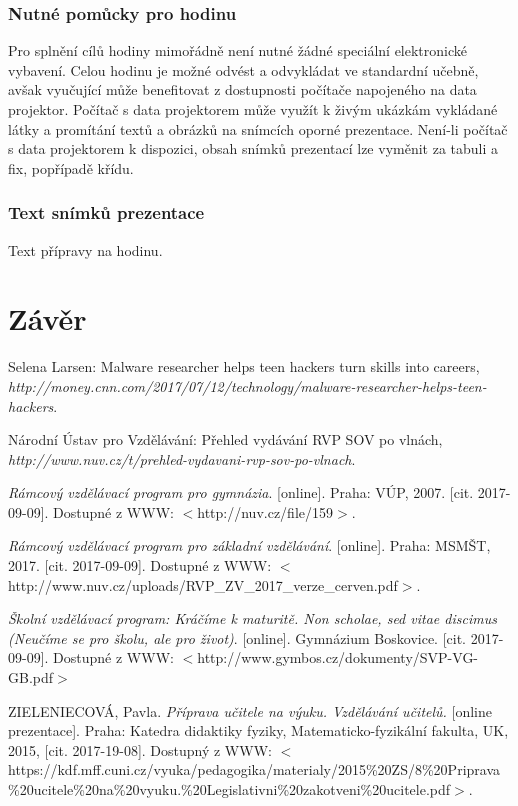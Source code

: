 \documentclass[a4paper, 12pt]{article}
\begin{document}
\subsubsection{Nutné pomůcky pro hodinu}
Pro splnění cílů hodiny mimořádně není nutné žádné speciální elektronické vybavení. Celou hodinu je možné odvést a odvykládat ve standardní učebně, avšak vyučující může benefitovat z dostupnosti počítače napojeného na data projektor. Počítač s data projektorem může využít k živým ukázkám vykládané látky a promítání textů a obrázků na snímcích oporné prezentace. Není-li počítač s data projektorem k dispozici, obsah snímků prezentací lze vyměnit za tabuli a fix, popřípadě křídu.

\subsubsection{Text snímků prezentace}
Text přípravy na hodinu.





\newpage
\section{Závěr}

\newpage
\begin{thebibliography}{9}

    Selena Larsen: Malware researcher helps teen hackers turn skills into careers,
    \\\textit{http://money.cnn.com/2017/07/12/technology/malware-researcher-helps-teen-hackers}.

    Národní Ústav pro Vzdělávání: Přehled vydávání RVP SOV po vlnách,
    \\\textit{http://www.nuv.cz/t/prehled-vydavani-rvp-sov-po-vlnach}.

    \textit{Rámcový vzdělávací program pro gymnázia}. [online]. Praha: VÚP, 2007. [cit. 2017-09-09]. Dostupné z WWW: $<$http://nuv.cz/file/159$>$.

    \textit{Rámcový vzdělávací program pro základní vzdělávání}. [online]. Praha: MSMŠT, 2017. [cit. 2017-09-09]. Dostupné z WWW: $<$http://www.nuv.cz/uploads/RVP\_ZV\_2017\_verze\_cerven.pdf$>$.

    \textit{Školní vzdělávací program: Kráčíme k maturitě. Non scholae, sed vitae discimus (Neučíme se pro školu, ale pro život)}. [online]. Gymnázium Boskovice. [cit. 2017-09-09]. Dostupné z WWW: $<$http://www.gymbos.cz/dokumenty/SVP-VG-GB.pdf$>$


    ZIELENIECOVÁ, Pavla. \textit{Příprava učitele na výuku. Vzdělávání učitelů.} [online prezentace]. Praha: Katedra didaktiky fyziky, Matematicko-fyzikální fakulta, UK, 2015, [cit. 2017-19-08]. Dostupný z WWW: $<$https://kdf.mff.cuni.cz/vyuka/pedagogika/materialy/2015\%20ZS/8\%20Priprava\\\%20ucitele\%20na\%20vyuku.\%20Legislativni\%20zakotveni\%20ucitele.pdf$>$.

\end{thebibliography}
\end{document}

